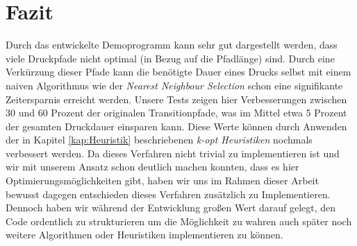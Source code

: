 \documentclass[12pt, a4paper]{article}
\begin{document}
\section{Fazit}
Durch das entwickelte Demoprogramm kann sehr gut dargestellt werden, dass viele Druckpfade nicht optimal (in Bezug auf die Pfadlänge) sind. Durch eine Verkürzung dieser Pfade kann die benötigte Dauer eines Drucks selbst mit einem naiven Algorithmus wie der \textit{Nearest Neighbour Selection} schon eine signifikante Zeitersparnis erreicht werden. Unsere Tests zeigen hier Verbesserungen zwischen 30 und 60 Prozent der originalen Transitionpfade, was im Mittel etwa 5 Prozent der gesamten Druckdauer einsparen kann. Diese Werte können durch Anwenden der in Kapitel \ref{kap:Heuristik} beschriebenen \textit{k-opt Heuristiken} nochmals verbessert werden. Da dieses Verfahren nicht trivial zu implementieren ist und wir mit unserem Ansatz schon deutlich machen konnten, dass es hier Optimierungsmöglichkeiten gibt, haben wir uns im Rahmen dieser Arbeit bewusst dagegen entschieden dieses Verfahren zusätzlich zu Implementieren. 
Dennoch haben wir während der Entwicklung großen Wert darauf gelegt, den Code ordentlich zu strukturieren um die Möglichkeit zu wahren auch später noch weitere Algorithmen oder Heuristiken implementieren zu können.

\newpage


\listoffigures
\end{document}
